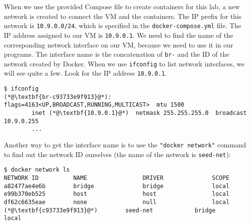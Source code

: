 When we use the provided Compose file to create
containers for this lab, a new network is created
to connect the VM and the containers. The
IP prefix for this network is \texttt{10.9.0.0/24},
which is specified in the \texttt{docker-compose.yml}
file. The IP address assigned to our VM is
\texttt{10.9.0.1}. We need to find the name of
the corresponding network interface on our VM, because we
need to use it in our programs.
The interface name is the concatenation of \texttt{br-}
and the ID of the network created by Docker.
When we use \texttt{ifconfig} to list network interfaces,
we will see quite a few. Look for the IP address
\texttt{10.9.0.1}.


\begin{lstlisting}
$ ifconfig
(*@\textbf{br-c93733e9f913}@*): flags=4163<UP,BROADCAST,RUNNING,MULTICAST>  mtu 1500
        inet (*@\textbf{10.9.0.1}@*)  netmask 255.255.255.0  broadcast 10.9.0.255
        ...
\end{lstlisting}


Another way to get the interface name is to use the \texttt{"docker network"} command to
find out the network ID ourselves (the name of the network is \texttt{seed-net}):

\begin{lstlisting}
$ docker network ls
NETWORK ID          NAME                DRIVER              SCOPE
a82477ae4e6b        bridge              bridge              local
e99b370eb525        host                host                local
df62c6635eae        none                null                local
(*@\textbf{c93733e9f913}@*)        seed-net            bridge              local
\end{lstlisting}


